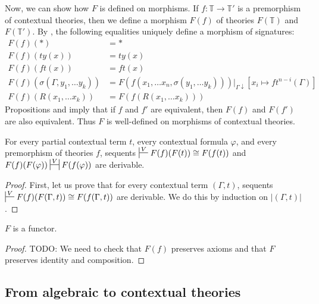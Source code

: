\documentclass[reqno]{amsart}
\theoremstyle{definition}
\theoremstyle{remark}
\numberwithin{figure}{section}
\begin{document}
Now, we can show how $F$ is defined on morphisms.
If $f : \mathbb{T} \to \mathbb{T}'$ is a premorphism of contextual theories, then we define a morphism $F(f)$ of theories $F(\mathbb{T})$ and $F(\mathbb{T}')$.
By , the following equalities uniquely define a morphism of signatures:
\begin{align*}
F(f)(*) & = * \\
F(f)(ty(x)) & = ty(x) \\
F(f)(ft(x)) & = ft(x) \\
F(f)(\sigma(\Gamma, y_1, \ldots y_k)) & = F(f(x_1, \ldots x_n, \sigma(y_1, \ldots y_k)))|_{\Gamma\downarrow}[x_i \mapsto ft^{n-i}(\Gamma)] \\
F(f)(R(x_1, \ldots x_k)) & = F(f(R(x_1, \ldots x_k)))
\end{align*}
Propositions  and  imply that if $f$ and $f'$ are equivalent, then $F(f)$ and $F(f')$ are also equivalent.
Thus $F$ is well-defined on morphisms of contextual theories.

\begin{lem}
For every partial contextual term $t$, every contextual formula $\varphi$, and every premorphism of theories $f$,
    sequents $\sststile{}{V} F(f)(F(t)) \cong F(f(t))$ and $F(f)(F(\varphi)) \ssststile{}{V} F(f(\varphi))$ are derivable.
\end{lem}
\begin{proof}
First, let us prove that for every contextual term $(\Gamma,t)$, sequents $\sststile{}{V} F(f)(F(\Gamma,t)) \cong F(f(\Gamma,t))$ are derivable.
We do this by induction on $|(\Gamma,t)|$.
\end{proof}

\begin{lem}
$F$ is a functor.
\end{lem}
\begin{proof}
TODO: We need to check that $F(f)$ preserves axioms and that $F$ preserves identity and composition.
\end{proof}

\subsection{From algebraic to contextual theories}
\end{document}
